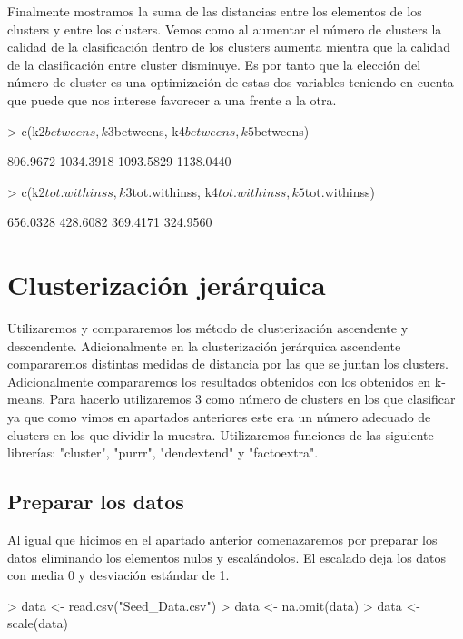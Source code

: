 \documentclass [a4paper] {article}
\begin{document}
Finalmente mostramos la suma de las distancias entre los elementos de los clusters y entre los clusters.
Vemos como al aumentar el número de clusters la calidad de la clasificación dentro de los clusters aumenta mientra que la calidad de la clasificación entre cluster disminuye.
Es por tanto que la elección del número de cluster es una optimización de estas dos variables teniendo en cuenta que puede que nos interese favorecer a una frente a la otra.
\begin{Schunk}
\begin{Sinput}
> c(k2$betweens, k3$betweens, k4$betweens, k5$betweens)
\end{Sinput}
\begin{Soutput}
[1]  806.9672 1034.3918 1093.5829 1138.0440
\end{Soutput}
\begin{Sinput}
> c(k2$tot.withinss, k3$tot.withinss, k4$tot.withinss, k5$tot.withinss)
\end{Sinput}
\begin{Soutput}
[1] 656.0328 428.6082 369.4171 324.9560
\end{Soutput}
\end{Schunk}

\newpage
\section{Clusterización jerárquica}
Utilizaremos y compararemos los método de clusterización ascendente y descendente.
Adicionalmente en la clusterización jerárquica ascendente compararemos distintas medidas de distancia por las que se juntan los clusters.
Adicionalmente compararemos los resultados obtenidos con los obtenidos en k-means.
Para hacerlo utilizaremos 3 como número de clusters en los que clasificar ya que como vimos en apartados anteriores este era un número adecuado de clusters en los que dividir la muestra.
Utilizaremos funciones de las siguiente librerías: "cluster", "purrr", "dendextend" y "factoextra".

\subsection{Preparar los datos}
Al igual que hicimos en el apartado anterior comenazaremos por preparar los datos eliminando los elementos nulos y escalándolos.
El escalado deja los datos con media 0 y desviación estándar de 1.
\begin{Schunk}
\begin{Sinput}
> data <- read.csv("Seed_Data.csv")
> data <- na.omit(data)
> data <- scale(data)
\end{Sinput}
\end{Schunk}
\end{document}
